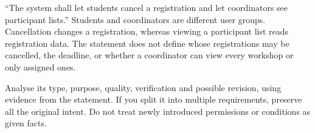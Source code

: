 \answerlabel\blankbox{5.2cm}
\begin{contenttable}
{“The system shall let students cancel a registration and let coordinators see participant lists.”}
{Students and coordinators are different user groups. Cancellation changes a registration, whereas viewing a participant list reads registration data. The statement does not define whose registrations may be cancelled, the deadline, or whether a coordinator can view every workshop or only assigned ones.}
\end{contenttable}
{Analyse its type, purpose, quality, verification and possible revision, using evidence from the statement. If you split it into multiple requirements, preserve all the original intent. Do not treat newly introduced permissions or conditions as given facts.}

